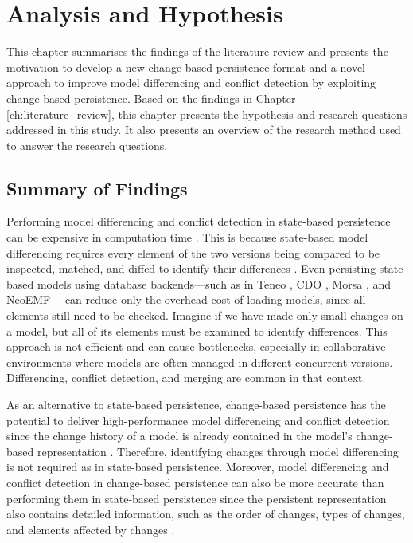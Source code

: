\chapter{Analysis and Hypothesis}
\label{ch:analysis_and_hypothesis}

This chapter summarises the findings of the literature review and presents the motivation to develop a new change-based persistence format and a novel approach to improve model differencing and conflict detection by exploiting change-based persistence. Based on the findings in Chapter \ref{ch:literature_review}, this chapter presents the hypothesis and research questions addressed in this study. It also presents an overview of the research method used to answer the research questions.

\section{Summary of Findings}
\label{sec:a_new_change_based_persistence}

Performing model differencing and conflict detection in state-based persistence can be expensive in computation time \cite{DBLP:conf/edoc/KoegelHLHD10}. This is because state-based model differencing requires every element of the two versions being compared to be inspected, matched, and diffed to identify their differences \cite{emfcompare2018developer}. Even persisting state-based models using database backends—such as in Teneo \cite{eclipse2017teneo}, CDO \cite{eclipse2019cdo}, Morsa \cite{DBLP:conf/models/Espinazo-PaganCM11}, and NeoEMF \cite{daniel2016neoemf}—can reduce only the overhead cost of loading models, since all elements still need to be checked. Imagine if we have made only small changes on a model, but all of its elements must be examined to identify differences. This approach is not efficient and can cause bottlenecks, especially in collaborative environments where models are often managed in different concurrent versions. Differencing, conflict detection, and merging are common in that context.

As an alternative to state-based persistence, change-based persistence has the potential to deliver high-performance model differencing and conflict detection since the change history of a model is already contained in the model’s change-based representation \cite{DBLP:conf/sde/LippeO92,DBLP:conf/caise/IgnatN05,koegel2010emfstore}. Therefore, identifying changes through model differencing is not required as in state-based persistence. Moreover, model differencing and conflict detection in change-based persistence can also be more accurate than performing them in state-based persistence since the persistent representation also contains detailed information, such as the order of changes, types of changes, and elements affected by changes \cite{DBLP:journals/entcs/RobbesL07,DBLP:conf/sde/LippeO92,DBLP:conf/caise/IgnatN05,mens2002state}.

